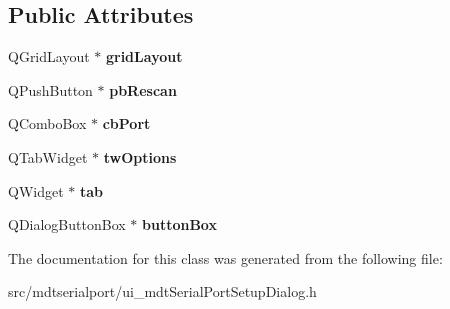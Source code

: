 \subsection*{Public Attributes}
\begin{DoxyCompactItemize}
\item 
\hypertarget{class_ui__mdt_serial_port_setup_dialog_a13a11e9f9ccf2a2b55dcb9b90fb4db94}{
QGridLayout $\ast$ {\bfseries gridLayout}}
\label{class_ui__mdt_serial_port_setup_dialog_a13a11e9f9ccf2a2b55dcb9b90fb4db94}

\item 
\hypertarget{class_ui__mdt_serial_port_setup_dialog_a00ab731bc8c63f64ef981783f3434c17}{
QPushButton $\ast$ {\bfseries pbRescan}}
\label{class_ui__mdt_serial_port_setup_dialog_a00ab731bc8c63f64ef981783f3434c17}

\item 
\hypertarget{class_ui__mdt_serial_port_setup_dialog_afbf0c0bf5fe40ba41986a4548dd32ad1}{
QComboBox $\ast$ {\bfseries cbPort}}
\label{class_ui__mdt_serial_port_setup_dialog_afbf0c0bf5fe40ba41986a4548dd32ad1}

\item 
\hypertarget{class_ui__mdt_serial_port_setup_dialog_a679def9ad26fd3b5d14ce47c0445dae9}{
QTabWidget $\ast$ {\bfseries twOptions}}
\label{class_ui__mdt_serial_port_setup_dialog_a679def9ad26fd3b5d14ce47c0445dae9}

\item 
\hypertarget{class_ui__mdt_serial_port_setup_dialog_a2fba2d05e85b4d015d317703637d387f}{
QWidget $\ast$ {\bfseries tab}}
\label{class_ui__mdt_serial_port_setup_dialog_a2fba2d05e85b4d015d317703637d387f}

\item 
\hypertarget{class_ui__mdt_serial_port_setup_dialog_ad838e2dd8bbfeb9c9dc084d1f7d3e023}{
QDialogButtonBox $\ast$ {\bfseries buttonBox}}
\label{class_ui__mdt_serial_port_setup_dialog_ad838e2dd8bbfeb9c9dc084d1f7d3e023}

\end{DoxyCompactItemize}


The documentation for this class was generated from the following file:\begin{DoxyCompactItemize}
\item 
src/mdtserialport/ui\_\-mdtSerialPortSetupDialog.h\end{DoxyCompactItemize}
